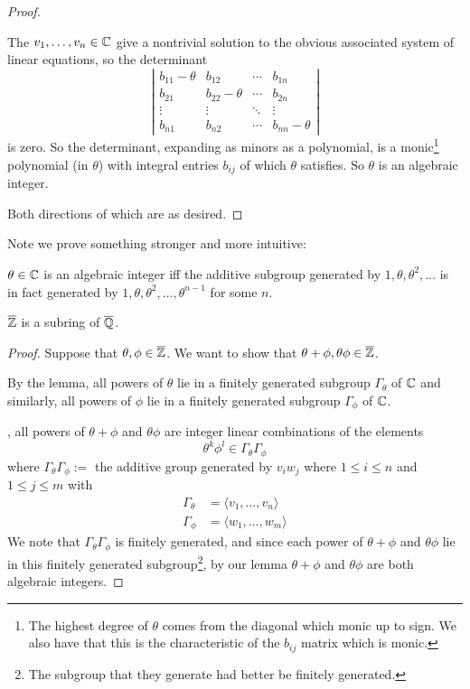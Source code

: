 \begin{proof}
\begin{description}
            The $v_1, \dots, v_n\in \mathbb C$ give a nontrivial solution to the obvious associated system of linear equations, so the determinant
            \[\left|\begin{array}{cccc}
                    b_{11} - \theta & b_{12}          & \cdots & b_{1n}          \\
                    b_{21}          & b_{22} - \theta & \cdots & b_{2n}          \\
                    \vdots          & \vdots          & \ddots & \vdots          \\
                    b_{n1}          & b_{n2}          & \cdots & b_{nn} - \theta
                \end{array}\right|\]
            is zero. So the determinant, expanding as minors as a polynomial, is a monic\footnote{The highest degree of $\theta$ comes from the diagonal which monic up to sign. We also have that this is the characteristic of the $b_{ij}$ matrix which is monic.} polynomial (in $\theta$) with integral entries $b_{ij}$ of which $\theta$ satisfies. So $\theta$ is an algebraic integer.
    \end{description}
    Both directions of which are as desired.
\end{proof}

Note we prove something stronger and more intuitive:
\begin{lemma*}
    $\theta\in\mathbb C$ is an algebraic integer iff the additive subgroup generated by $1, \theta, \theta^2, \dots$ is in fact generated by $1, \theta, \theta^2, \dots, \theta^{n-1}$ for some $n$.
\end{lemma*}
\begin{theorem}
    $\overline{\mathbb Z}$ is a subring of $\overline{\mathbb Q}$.
\end{theorem}
\begin{proof}
    Suppose that $\theta, \phi\in\overline{\mathbb Z}$. We want to show that $\theta + \phi, \theta\phi\in\overline{\mathbb Z}$.

    By the lemma, all powers of $\theta$ lie in a finitely generated subgroup $\Gamma_\theta$ of $\mathbb C$ and similarly, all powers of $\phi$ lie in a finitely generated subgroup $\Gamma_\phi$ of $\mathbb C$.

    \otoh, all powers of $\theta + \phi$ and $\theta\phi$ are integer linear combinations of the elements
    \[\theta^k \phi^l\in \Gamma_\theta\Gamma_\phi\]
    where $\Gamma_\theta\Gamma_\phi := $ the additive group generated by $v_iw_j$ where $1\leq i\leq n$ and $1\leq j\leq m$ with
    \begin{align*}
        \Gamma_\theta & = \langle v_1, \dots, v_n\rangle \\
        \Gamma_\phi   & = \langle w_1, \dots, w_m\rangle
    \end{align*}
    We note that $\Gamma_\theta\Gamma_\phi$ is finitely generated, and since each power of $\theta+\phi$ and $\theta\phi$ lie in this finitely generated subgroup\footnote{The subgroup that they generate had better be finitely generated.}, by our lemma $\theta + \phi$ and $\theta\phi$ are both algebraic integers.
\end{proof}

